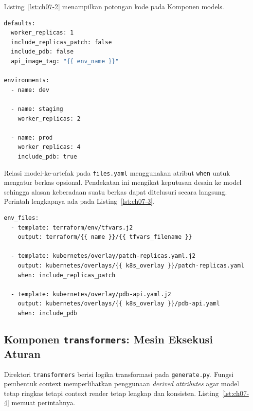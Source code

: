 Listing~\ref{lst:ch07-2} menampilkan potongan kode pada Komponen models.
\begin{lstlisting}[language=bash,caption={Listing: Cuplikan model environment (mde/models/environments.yaml)}, label={lst:ch07-2}]
defaults:
  worker_replicas: 1
  include_replicas_patch: false
  include_pdb: false
  api_image_tag: "{{ env_name }}"

environments:
  - name: dev

  - name: staging
    worker_replicas: 2

  - name: prod
    worker_replicas: 4
    include_pdb: true
\end{lstlisting}

Relasi model-ke-artefak pada \texttt{files.yaml} menggunakan atribut \texttt{when} untuk mengatur berkas opsional. Pendekatan ini mengikat keputusan desain ke model sehingga alasan keberadaan suatu berkas dapat ditelusuri secara langsung. Perintah lengkapnya ada pada Listing~\ref{lst:ch07-3}.

\begin{lstlisting}[language=bash,caption={Listing: Cuplikan aturan render file (mde/models/files.yaml)}, label={lst:ch07-3}]
env_files:
  - template: terraform/env/tfvars.j2
    output: terraform/{{ name }}/{{ tfvars_filename }}

  - template: kubernetes/overlay/patch-replicas.yaml.j2
    output: kubernetes/overlays/{{ k8s_overlay }}/patch-replicas.yaml
    when: include_replicas_patch

  - template: kubernetes/overlay/pdb-api.yaml.j2
    output: kubernetes/overlays/{{ k8s_overlay }}/pdb-api.yaml
    when: include_pdb
\end{lstlisting}

\subsection[Komponen transformers]{Komponen \texttt{transformers}: Mesin Eksekusi Aturan}\label{subsec:mde-transformers}

Direktori \texttt{transformers} berisi logika transformasi pada \texttt{generate.py}. Fungsi pembentuk context memperlihatkan penggunaan \textit{derived attributes} agar model tetap ringkas tetapi context render tetap lengkap dan konsisten. Listing~\ref{lst:ch07-4} memuat perintahnya.

